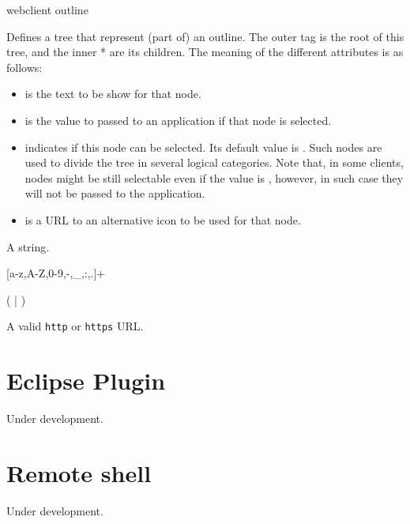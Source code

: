\bigskip
\xmlstruct
{webclient}
{outline}
{%
%
  Defines a tree that represent (part of) an outline. The outer
   tag is the root of this tree, and the inner
  * are its children. The meaning of
  the different attributes is as follows:
%
\begin{itemize}
  \item {} is the text to be show for that node.
  \item {} is the value to passed to an application if that node is selected.
  \item {} indicates if this node can be
    selected. Its default value is . Such nodes
    are used to divide the tree in several logical categories.  
    Note that, in some clients, nodes might be still selectable even
    if the value is , however, in such case they
    will not be passed to the application.
  \item {} is a URL to an alternative icon to be
    used for that node.
\end{itemize}
%
\bigskip
\noindent
{}

A string.

\bigskip
\noindent
{}

[a-z,A-Z,0-9,-,\_,:,.]+

\bigskip
\noindent
{}

(  |  )

\bigskip
\noindent
{}

A valid \texttt{http} or \texttt{https} URL.
}



\section{Eclipse Plugin}
\label{ch:clients:eclipse}

Under development. 

\section{Remote shell}
\label{ch:clients:shell}

Under development. 
